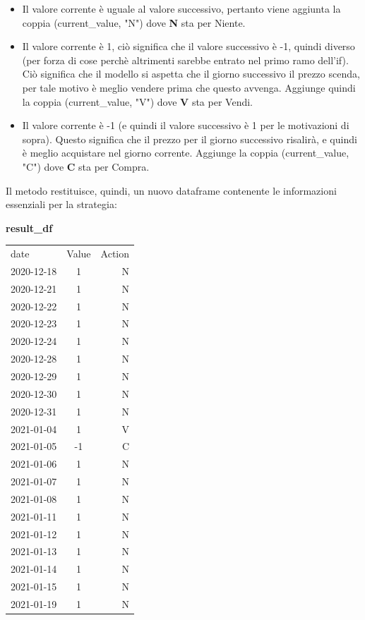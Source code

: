 \documentclass{article}
\begin{document}
\begin{itemize}
    \item Il valore corrente è uguale al valore successivo, pertanto viene aggiunta la coppia (current\_value, "N") dove \textbf{N} sta per Niente.
    \item Il valore corrente è 1, ciò significa che il valore successivo è -1, quindi diverso (per forza di cose perchè altrimenti sarebbe entrato nel primo ramo dell'if). Ciò significa che il modello si aspetta che il giorno successivo il prezzo scenda, per tale motivo è meglio vendere prima che questo avvenga. Aggiunge quindi la coppia (current\_value, "V") dove \textbf{V} sta per Vendi.
    \item Il valore corrente è -1 (e quindi il valore successivo è 1 per le motivazioni di sopra). Questo significa che il prezzo per il giorno successivo risalirà, e quindi è meglio acquistare nel giorno corrente. Aggiunge la coppia (current\_value, "C") dove \textbf{C} sta per Compra.
\end{itemize}
\newpage
Il metodo restituisce, quindi, un nuovo dataframe contenente le informazioni essenziali per la strategia: 
\begin{center}
    \textbf{result\_df}\\
    \begin{tabular}{lcr}
    date & Value & Action\\          
    2020-12-18 & 1 & N\\
    2020-12-21 & 1 & N\\
    2020-12-22 & 1 & N\\
    2020-12-23 & 1 & N\\
    2020-12-24 & 1 & N\\
    2020-12-28 & 1 & N\\
    2020-12-29 & 1 & N\\
    2020-12-30 & 1 & N\\
    2020-12-31 & 1 & N\\
    2021-01-04 & 1 & V\\
    2021-01-05 & -1 & C\\
    2021-01-06 & 1 & N\\
    2021-01-07 & 1 & N\\
    2021-01-08 & 1 & N\\
    2021-01-11 & 1 & N\\
    2021-01-12 & 1 & N\\
    2021-01-13 & 1 & N\\
    2021-01-14 & 1 & N\\
    2021-01-15 & 1 & N\\
    2021-01-19 & 1 & N\\
    \end{tabular}
\end{center}
\end{document}
